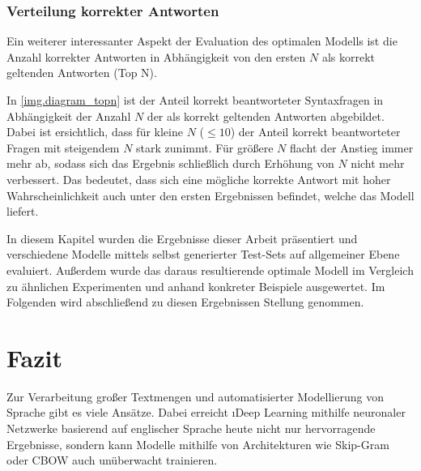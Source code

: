 \subsection{Verteilung korrekter Antworten}\label{ss.verteilungkorrekterantworten}
Ein weiterer interessanter Aspekt der Evaluation des optimalen Modells ist die Anzahl korrekter Antworten in Abhängigkeit von den ersten $N$ als korrekt geltenden Antworten (Top N).

In \autoref{img.diagram_topn} ist der Anteil korrekt beantworteter Syntaxfragen in Abhängigkeit der Anzahl $N$ der als korrekt geltenden Antworten abgebildet. Dabei ist ersichtlich, dass für kleine $N$ ($\leq 10$) der Anteil korrekt beantworteter Fragen mit steigendem $N$ stark zunimmt. Für größere $N$ flacht der Anstieg immer mehr ab, sodass sich das Ergebnis schließlich durch Erhöhung von $N$ nicht mehr verbessert. Das bedeutet, dass sich eine mögliche korrekte Antwort mit hoher Wahrscheinlichkeit auch unter den ersten Ergebnissen befindet, welche das Modell liefert.


In diesem Kapitel wurden die Ergebnisse dieser Arbeit präsentiert und verschiedene Modelle mittels selbst generierter Test-Sets auf allgemeiner Ebene evaluiert. Außerdem wurde das daraus resultierende optimale Modell im Vergleich zu ähnlichen Experimenten und anhand konkreter Beispiele ausgewertet. Im Folgenden wird abschließend zu diesen Ergebnissen Stellung genommen.

\chapter{Fazit}\label{c.fazit}
Zur Verarbeitung großer Textmengen und automatisierter Modellierung von Sprache gibt es viele Ansätze. Dabei erreicht \i{Deep Learning} mithilfe neuronaler Netzwerke basierend auf englischer Sprache heute nicht nur hervorragende Ergebnisse, sondern kann Modelle mithilfe von Architekturen wie Skip-Gram oder CBOW auch unüberwacht trainieren.

